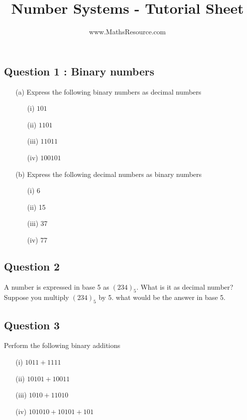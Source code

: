 \documentclass[]{article}
\title{Number Systems - Tutorial Sheet}
\author{www.MathsResource.com}
\begin{document}
\maketitle
\Large

\subsection*{Question 1 : Binary numbers}
\begin{itemize}
	\item[(a)] Express the following binary numbers as decimal numbers
	\begin{multicols}{2}
		\begin{itemize}
			\item[(i)] $101$
			\item[(ii)] $1101$
			\item[(iii)] $11011$
			\item[(iv)] $100101$
		\end{itemize}
	\end{multicols}

	\item[(b)] Express the following decimal numbers as binary numbers
	\begin{multicols}{2}
		\begin{itemize}
			\item[(i)] 6
			\item[(ii)] 15
			\item[(iii)] 37
			\item[(iv)] 77
		\end{itemize}
	\end{multicols}

\end{itemize}
\subsection*{Question 2}
A number is expressed in base 5 as $(234)_5$. What is it as decimal number?
Suppose you multiply $(234)_5$ by 5. what would be the answer in base 5.

\subsection*{Question 3}

 Perform the following binary additions
 \begin{multicols}{2}
  \begin{itemize}
  	\item[(i)] $1011+ 1111$
  	\item[(ii)] $10101  + 10011$
  	\item[(iii)] $1010 + 11010$
  	\item[(iv)] $101010 + 10101 + 101$
  \end{itemize}
 \end{multicols}
\end{document}
